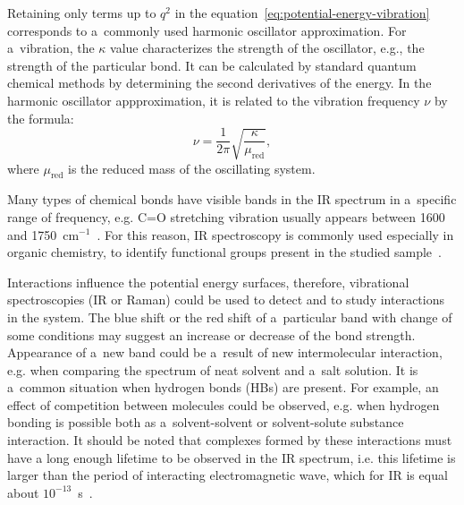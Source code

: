 Retaining only terms up to $q^2$ in the equation~\ref{eq:potential-energy-vibration} corresponds to a~commonly used harmonic oscillator approximation. For a~vibration, the $\kappa$ value characterizes the strength of the oscillator, e.g., the strength of the particular bond. It can be calculated by standard quantum chemical methods by determining the second derivatives of the energy. In the harmonic oscillator appproximation, it is related to the vibration frequency $\nu$ by the formula:
\begin{equation}
    \nu = \frac{1}{2\pi} \sqrt{\frac{\kappa}{\mu_{\text{red}}}},
\end{equation}
where $\mu_{\text{red}}$ is the reduced mass of the oscillating system.

Many types of chemical bonds have visible bands in the IR spectrum in a~specific range of frequency, e.g. C=O stretching vibration usually appears between 1600 and 1750~cm$^{-1}$~\cite{sadlej-spektroskopia}. For this reason, IR spectroscopy is commonly used especially in organic chemistry, to identify functional groups present in the studied sample~\cite{clayden-t1}.

Interactions influence the potential energy surfaces, therefore, vibrational spectroscopies (IR or Raman)  could be used to detect and to study interactions in the system. The blue shift or the red shift of a~particular band with change of some conditions may suggest an increase or decrease of the bond strength. Appearance of a~new band could be a~result of new intermolecular interaction, e.g. when comparing the spectrum of neat solvent and a~salt solution. It is a~common situation when hydrogen bonds (HBs) are present. For example, an effect of competition between molecules could be observed, e.g. when hydrogen bonding is possible both as a~solvent-solvent or solvent-solute substance interaction. It should be noted that complexes formed by these interactions must have a long enough lifetime to be observed in the IR spectrum, i.e. this lifetime is larger than the period of interacting electromagnetic wave, which for IR is equal about $10^{-13}$~s~\cite{kecki}.

